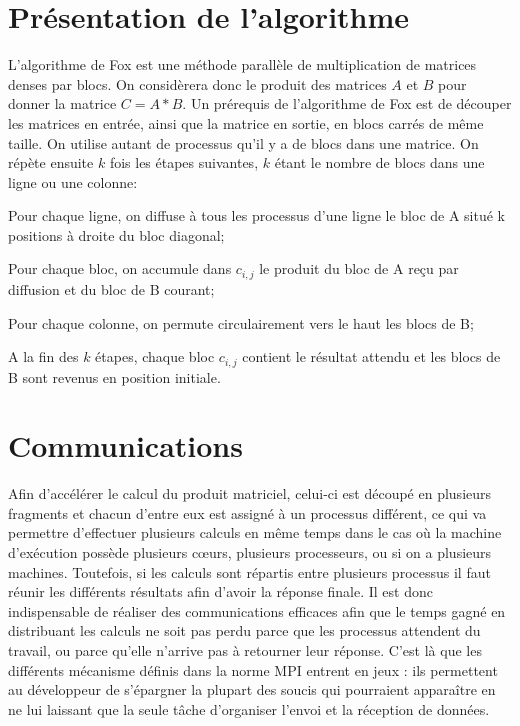 \documentclass[a4paper,11pt]{article}
\begin{document}
\section{Présentation de l'algorithme}
L'algorithme de Fox est une méthode parallèle de multiplication de matrices denses par blocs. On considèrera donc le produit des matrices $A$ et $B$ pour donner la matrice $C=A*B$.
Un prérequis de l'algorithme de Fox est de découper les matrices en entrée, ainsi que la matrice en sortie, en blocs carrés de même taille. On utilise autant de processus qu'il y a de blocs dans une matrice.
On répète ensuite $k$ fois les étapes suivantes, $k$ étant le nombre de blocs dans une ligne ou une colonne:
\begin{enum}
\item Pour chaque ligne, on diffuse à tous les processus d'une ligne le bloc de A situé k positions à droite du bloc diagonal;
\item Pour chaque bloc, on accumule dans $c_{i,j}$ le produit du bloc de A reçu par diffusion et du bloc de B courant;  
\item Pour chaque colonne, on permute circulairement vers le haut les blocs de B;
\end{enum}

A la fin des $k$ étapes, chaque bloc $c_{i,j}$ contient le résultat attendu et les blocs de B sont revenus en position initiale.

\section{Communications}
Afin d'accélérer le calcul du produit matriciel, celui-ci est découpé en plusieurs fragments et chacun d'entre eux est assigné à un processus différent, ce qui va permettre d'effectuer plusieurs calculs en même temps dans le cas où la machine d'exécution possède plusieurs cœurs, plusieurs processeurs, ou si on a plusieurs machines. Toutefois, si les calculs sont répartis entre plusieurs processus il faut réunir les différents résultats afin d'avoir la réponse finale. Il est donc indispensable de réaliser des communications efficaces afin que le temps gagné en distribuant les calculs ne soit pas perdu parce que les processus attendent du travail, ou parce qu'elle n'arrive pas à retourner leur réponse. C'est là que les différents mécanisme définis dans la norme MPI entrent en jeux : ils permettent au développeur de s'épargner la plupart des soucis qui pourraient apparaître en ne lui laissant que la seule tâche d'organiser l'envoi et la réception de données.
\end{document}
